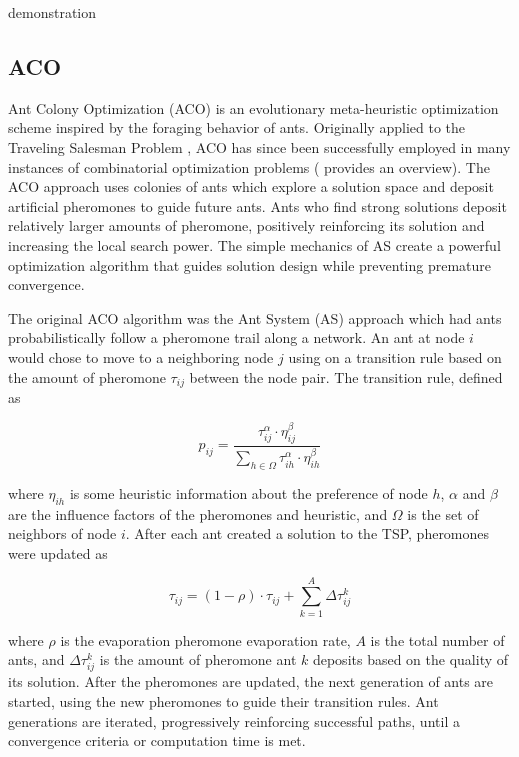 \documentclass[preprint,12pt]{elsarticle}
\begin{document}
demonstration



\subsection{ACO} \label{sec:ACO}
Ant Colony Optimization (ACO) is an evolutionary meta-heuristic optimization scheme inspired by the foraging behavior of ants. Originally applied to the Traveling Salesman Problem \citep{Dorigo1996}, ACO has since been successfully employed in many instances of combinatorial optimization problems (\cite{Dorigo1999} provides an overview). The ACO approach uses colonies of ants which explore a solution space and deposit artificial pheromones to guide future ants. Ants who find strong solutions deposit relatively larger amounts of pheromone, positively reinforcing its solution and increasing the local search power. The simple mechanics of AS create a powerful optimization algorithm that guides solution design while preventing premature convergence. 

The original ACO algorithm was the Ant System (AS) approach \citep{Dorigo1996} which had ants probabilistically follow a pheromone trail along a network. An ant at node $i$ would chose to move to a neighboring node $j$ using on a transition rule based on the amount of pheromone $\tau_{ij}$ between the node pair. The transition rule, defined as 

\begin{equation}
p_{ij}=\frac{\tau_{ij}^\alpha\cdot\eta_{ij}^\beta}{\sum_{h\in\Omega}
	\tau_{ih}^\alpha\cdot\eta_{ih}^\beta}
\label{eq:AStrans}
\end{equation}

\noindent where $\eta_{ih}$ is some heuristic information about the preference of node $h$, $\alpha$ and $\beta$ are the influence factors of the pheromones and heuristic, and $\Omega$ is the set of neighbors of node $i$. After each ant created a solution to the TSP, pheromones were updated as

\begin{equation}
\tau_{ij}=(1-\rho)\cdot\tau_{ij}+\sum_{k=1}^{A}
\Delta\tau_{ij}^k
\label{eq:ASup}
\end{equation}

\noindent where $\rho$ is the evaporation pheromone evaporation rate, $A$ is the total number of ants, and $\Delta\tau_{ij}^k$ is the amount of pheromone ant $k$ deposits based on the quality of its solution. After the pheromones are updated, the next generation of ants are started, using the new pheromones to guide their transition rules. Ant generations are iterated, progressively reinforcing successful paths, until a convergence criteria or computation time is met.
\end{document}
